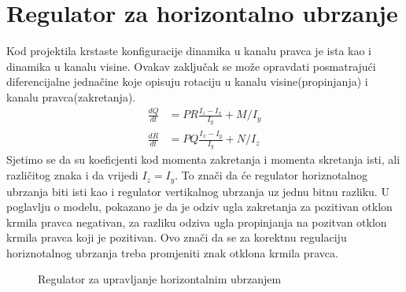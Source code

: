 \section{Regulator za horizontalno ubrzanje}
Kod projektila krstaste konfiguracije dinamika u kanalu pravca je ista kao i dinamika u kanalu visine. 
Ovakav zaključak se može opravdati posmatrajući diferencijalne jednačine koje opisuju 
rotaciju u kanalu visine(propinjanja) i kanalu pravca(zakretanja). 
\begin{align*}
    \frac{dQ}{dt} &= PR\frac{I_z-I_x}{I_y} + M/I_y\\
    \frac{dR}{dt} &= PQ\frac{I_x-I_y}{I_y} + N/I_z
\end{align*}
Sjetimo se da su koeficjenti kod momenta zakretanja i momenta skretanja isti, ali različitog znaka i da vrijedi $I_z = I_y $. 
To znači da će regulator horiznotalnog ubrzanja biti isti kao i regulator 
vertikalnog ubrzanja uz jednu bitnu razliku. U poglavlju o modelu, pokazano je da je odziv ugla zakretanja 
za pozitivan otklon krmila pravca negativan, za razliku odziva ugla propinjanja na pozitvan otklon krmila pravca koji je 
pozitivan. Ovo znači da se za korektnu regulaciju horiznotalnog ubrzanja treba promjeniti znak 
otklona krmila pravca. 
\begin{figure}[!ht]
    \centering
    \caption{Regulator za upravljanje horizontalnim ubrzanjem}
    \end{figure}
